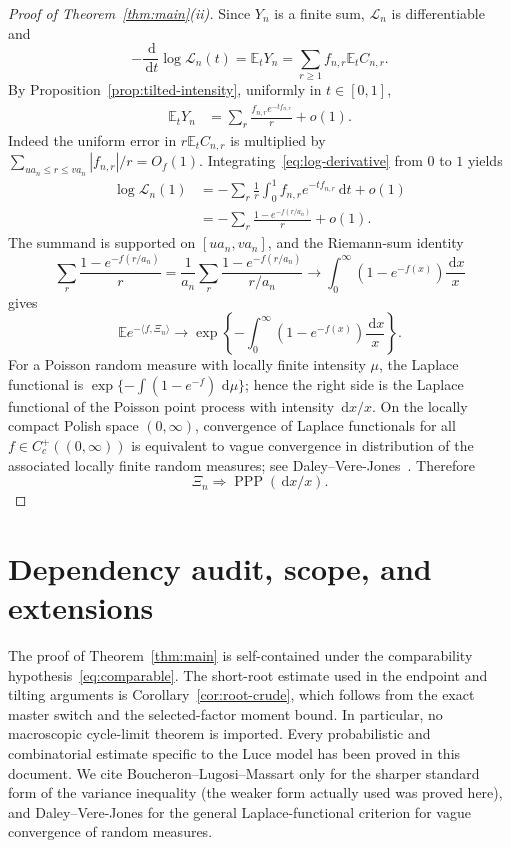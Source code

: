 \documentclass[11pt]{article}
\newcommand{\E}{\mathbb E}
\newcommand{\1}{\mathbf 1}
\newcommand{\PPP}{\operatorname{PPP}}
\newcommand{\cL}{\mathcal L}
\newcommand{\dd}{\,\mathrm d}
\theoremstyle{definition}
\theoremstyle{remark}
\begin{document}
\begin{proof}[Proof of Theorem~\ref{thm:main}(ii)]
Since $Y_n$ is a finite sum, $\cL_n$ is differentiable and
\[
  -\frac{\dd}{\dd t}\log\cL_n(t)=\E_tY_n
  =\sum_{r\geq1}f_{n,r}\E_tC_{n,r}.
\]
By Proposition~\ref{prop:tilted-intensity}, uniformly in $t\in[0,1]$,
\begin{align}
 \E_tY_n
 &=\sum_r\frac{f_{n,r}e^{-tf_{n,r}}}{r}+o(1).
 \label{eq:log-derivative}
\end{align}
Indeed the uniform error in $r\E_tC_{n,r}$ is multiplied by
$\sum_{ua_n\leq r\leq va_n}|f_{n,r}|/r=O_f(1)$.
Integrating~\eqref{eq:log-derivative} from $0$ to $1$ yields
\begin{align}
 \log\cL_n(1)
 &=-\sum_r\frac1r\int_0^1f_{n,r}e^{-tf_{n,r}}\dd t+o(1)\\
 &=-\sum_r\frac{1-e^{-f(r/a_n)}}r+o(1).
 \label{eq:Laplace-sum}
\end{align}
The summand is supported on $[ua_n,va_n]$, and the Riemann-sum identity
\[
 \sum_r\frac{1-e^{-f(r/a_n)}}r
 =\frac1{a_n}\sum_r
 \frac{1-e^{-f(r/a_n)}}{r/a_n}
 \longrightarrow
 \int_0^\infty(1-e^{-f(x)})\frac{\dd x}{x}
\]
gives
\begin{equation}\label{eq:Laplace-limit}
 \E e^{-\langle f,\Xi_n\rangle}
 \longrightarrow
 \exp\left\{-\int_0^\infty(1-e^{-f(x)})\frac{\dd x}{x}\right\}.
\end{equation}
For a Poisson random measure with locally finite intensity $\mu$, the
Laplace functional is $\exp\{-\int(1-e^{-f})\,\dd\mu\}$; hence the
right side is the Laplace functional of the Poisson point process with
intensity $\dd x/x$.  On the locally compact Polish space
$(0,\infty)$, convergence of Laplace functionals for all
$f\in C_c^+((0,\infty))$ is equivalent to vague convergence in
distribution of the associated locally finite random measures; see
Daley--Vere-Jones~\cite[Proposition~11.1.VIII]{DVJ2008}.  Therefore
\[
  \Xi_n\Rightarrow\PPP(\dd x/x).
\]
\end{proof}

\section{Dependency audit, scope, and extensions}

The proof of Theorem~\ref{thm:main} is self-contained under the
comparability hypothesis~\eqref{eq:comparable}.  The short-root estimate
used in the endpoint and tilting arguments is Corollary~\ref{cor:root-crude},
which follows from the exact master switch and the selected-factor moment
bound.  In particular, no macroscopic cycle-limit theorem is imported.
Every probabilistic and combinatorial estimate specific to the Luce model
has been proved in this document.  We cite Boucheron--Lugosi--Massart only for the sharper
standard form of the variance inequality (the weaker form actually used
was proved here), and Daley--Vere-Jones for the general
Laplace-functional criterion for vague convergence of random measures.
\end{document}

